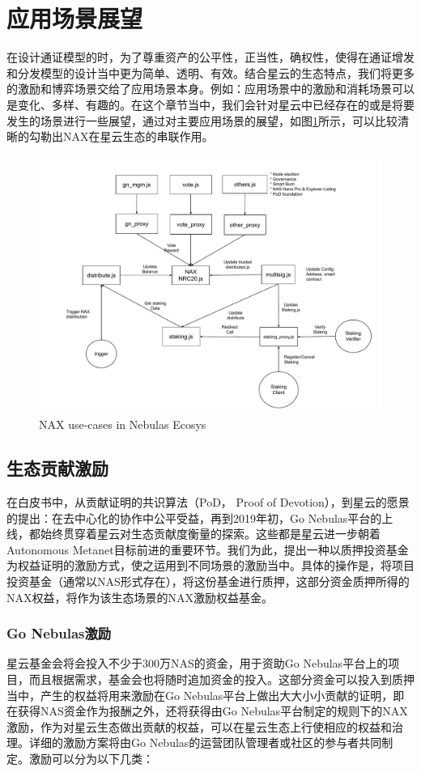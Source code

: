 \section{应用场景展望}
在设计通证模型的时，为了尊重资产的公平性，正当性，确权性，使得在通证增发和分发模型的设计当中更为简单、透明、有效。结合星云的生态特点，我们将更多的激励和博弈场景交给了应用场景本身。例如：应用场景中的激励和消耗场景可以是变化、多样、有趣的。在这个章节当中，我们会针对星云中已经存在的或是将要发生的场景进行一些展望，通过对主要应用场景的展望，如图\ref{fig:nax_ecosys}所示，可以比较清晰的勾勒出NAX在星云生态的串联作用。

\begin{figure}[htbp]
  \centering
    \includegraphics[width=1\textwidth]{../common/nax.pdf}
    \caption{NAX use-cases in Nebulas Ecosys \label{fig:nax_ecosys}}
\end{figure}

\subsection{生态贡献激励}
在白皮书中，从贡献证明的共识算法（PoD， Proof of Devotion），到星云的愿景的提出：在去中心化的协作中公平受益，再到2019年初，Go Nebulas平台的上线，都始终贯穿着星云对生态贡献度衡量的探索。这些都是星云进一步朝着Autonomous Metanet目标前进的重要环节。我们为此，提出一种以质押投资基金为权益证明的激励方式，使之运用到不同场景的激励当中。具体的操作是，将项目投资基金（通常以NAS形式存在），将这份基金进行质押，这部分资金质押所得的NAX权益，将作为该生态场景的NAX激励权益基金。

\subsubsection{Go Nebulas激励}
星云基金会将会投入不少于300万NAS的资金，用于资助Go Nebulas平台上的项目，而且根据需求，基金会也将随时追加资金的投入。这部分资金可以投入到质押当中，产生的权益将用来激励在Go Nebulas平台上做出大大小小贡献的证明，即在获得NAS资金作为报酬之外，还将获得由Go Nebulas平台制定的规则下的NAX激励，作为对星云生态做出贡献的权益，可以在星云生态上行使相应的权益和治理。详细的激励方案将由Go Nebulas的运营团队管理者或社区的参与者共同制定。激励可以分为以下几类：

